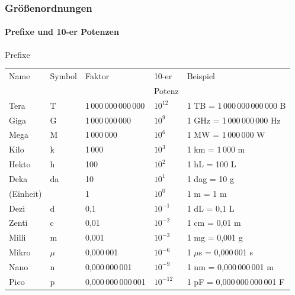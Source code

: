 \begin{frame}
  \frametitle{Gr\"o\ss{}enordnungen}
  \framesubtitle{Prefixe und 10-er Potenzen}
  \begin{block}{Prefixe}
    \pause 
    \begin{tabular}{@{}l*{4}{@{\,}l}@{}}
      Name     & Symbol & Faktor       & 10-er       & Beispiel \tabularnewline
      &&&                                Potenz      &  \tabularnewline\hline
      Tera     & T      & 1\,000\,000\,000\,000 & $10^{12}$ & 1 TB = 1\,000\,000\,000\,000 B \tabularnewline
      Giga     & G      & 1\,000\,000\,000 & $10^{9}$      & 1 GHz = 1\,000\,000\,000 Hz \tabularnewline
      Mega     & M      & 1\,000\,000   & $10^{6}$            & 1 MW = 1\,000\,000 W \tabularnewline
      Kilo     & k      & 1\,000       & $10^3$            & 1 km = 1\,000 m \tabularnewline
      Hekto    & h      & 100         & $10^2$            & 1 hL = 100 L \tabularnewline
      Deka     & da     & 10          & $10^1$            & 1 dag = 10 g \tabularnewline
      (Einheit)&        & 1           & $10^0$            & 1 m = 1 m \tabularnewline
      Dezi     & d      & 0,1         & $10^{-1}$         & 1 dL = 0,1 L \tabularnewline
      Zenti    & c      & 0,01        & $10^{-2}$         & 1 cm = 0,01 m \tabularnewline
      Milli    & m      & 0,001       & $10^{-3}$         & 1 mg = 0,001 g \tabularnewline
      Mikro    & $\mu$  & 0,000\,001  & $10^{-6}$         & 1 $\mu$s = 0,000\,001 s \tabularnewline
      Nano     & n      & 0,000\,000\,001& $10^{-9}$      & 1 nm = 0,000\,000\,001 m \tabularnewline
      Pico     & p      & 0,000\,000\,000\,001& $10^{-12}$& 1 pF = 0,000\,000\,000\,001 F \tabularnewline
      \hline
    \end{tabular}
  \end{block} 
\end{frame}

